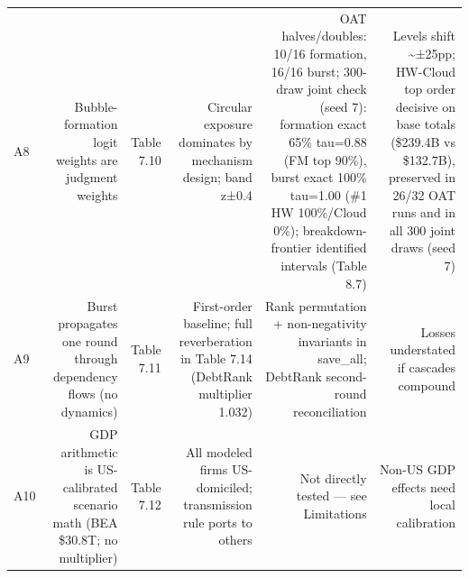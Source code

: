 \begin{tabular}{@{}lrrrrr@{}}
A8 & Bubble-formation logit weights are judgment weights & Table 7.10 & Circular exposure dominates by mechanism design; band z±0.4 & OAT halves/doubles: 10/16 formation, 16/16 burst; 300-draw joint check (seed 7): formation exact 65\% tau=0.88 (FM top 90\%), burst exact 100\% tau=1.00 (\#1 HW 100\%/Cloud 0\%); breakdown-frontier identified intervals (Table 8.7) & Levels shift \textasciitilde{}±25pp; HW-Cloud top order decisive on base totals (\$239.4B vs \$132.7B), preserved in 26/32 OAT runs and in all 300 joint draws (seed 7) \\
A9 & Burst propagates one round through dependency flows (no dynamics) & Table 7.11 & First-order baseline; full reverberation in Table 7.14 (DebtRank multiplier 1.032) & Rank permutation + non-negativity invariants in save\_all; DebtRank second-round reconciliation & Losses understated if cascades compound \\
A10 & GDP arithmetic is US-calibrated scenario math (BEA \$30.8T; no multiplier) & Table 7.12 & All modeled firms US-domiciled; transmission rule ports to others & Not directly tested — see Limitations & Non-US GDP effects need local calibration \\
\bottomrule
\end{tabular}
